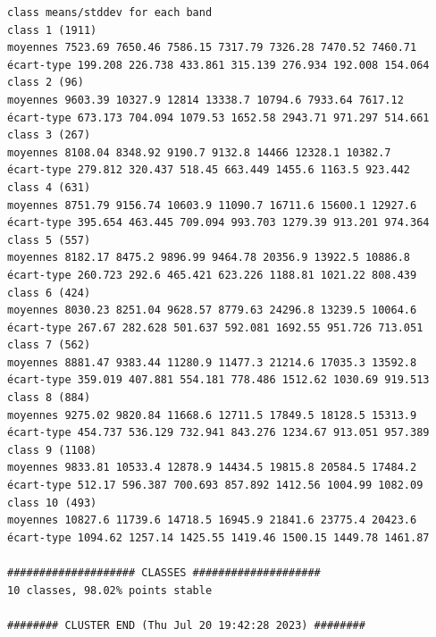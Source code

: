 \documentclass[environments,article,submit,pdftex,moreauthors]{Definitions/mdpi}
\begin{document}
\begin{scriptsize}
\begin{verbatim}
class means/stddev for each band
class 1 (1911)
moyennes 7523.69 7650.46 7586.15 7317.79 7326.28 7470.52 7460.71
écart-type 199.208 226.738 433.861 315.139 276.934 192.008 154.064
class 2 (96)
moyennes 9603.39 10327.9 12814 13338.7 10794.6 7933.64 7617.12
écart-type 673.173 704.094 1079.53 1652.58 2943.71 971.297 514.661
class 3 (267)
moyennes 8108.04 8348.92 9190.7 9132.8 14466 12328.1 10382.7
écart-type 279.812 320.437 518.45 663.449 1455.6 1163.5 923.442
class 4 (631)
moyennes 8751.79 9156.74 10603.9 11090.7 16711.6 15600.1 12927.6
écart-type 395.654 463.445 709.094 993.703 1279.39 913.201 974.364
class 5 (557)
moyennes 8182.17 8475.2 9896.99 9464.78 20356.9 13922.5 10886.8
écart-type 260.723 292.6 465.421 623.226 1188.81 1021.22 808.439
class 6 (424)
moyennes 8030.23 8251.04 9628.57 8779.63 24296.8 13239.5 10064.6
écart-type 267.67 282.628 501.637 592.081 1692.55 951.726 713.051
class 7 (562)
moyennes 8881.47 9383.44 11280.9 11477.3 21214.6 17035.3 13592.8
écart-type 359.019 407.881 554.181 778.486 1512.62 1030.69 919.513
class 8 (884)
moyennes 9275.02 9820.84 11668.6 12711.5 17849.5 18128.5 15313.9
écart-type 454.737 536.129 732.941 843.276 1234.67 913.051 957.389
class 9 (1108)
moyennes 9833.81 10533.4 12878.9 14434.5 19815.8 20584.5 17484.2
écart-type 512.17 596.387 700.693 857.892 1412.56 1004.99 1082.09
class 10 (493)
moyennes 10827.6 11739.6 14718.5 16945.9 21841.6 23775.4 20423.6
écart-type 1094.62 1257.14 1425.55 1419.46 1500.15 1449.78 1461.87

#################### CLASSES ####################
10 classes, 98.02% points stable

######## CLUSTER END (Thu Jul 20 19:42:28 2023) ########
\end{verbatim}
\end{scriptsize}
\end{document}
